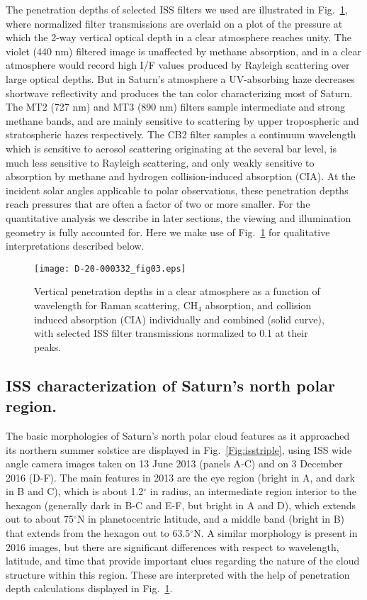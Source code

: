 \documentclass[article,11pt]{emulateapj}
\def\deg{$^\circ$ }
\def\degx{$^\circ$}
\def\chf{CH$_4$ }
\begin{document}
The penetration depths of selected ISS filters we used are illustrated
in Fig.\ \ref{Fig:ccdpendepth}, where normalized filter transmissions
are overlaid on a plot of the pressure at which the 2-way vertical optical depth
in a clear atmosphere reaches unity.  The violet (440 nm) filtered image is
unaffected by methane absorption, and in a clear atmosphere would record
high I/F values produced by Rayleigh scattering over large optical
depths. But in Saturn's atmosphere a UV-absorbing haze decreases
shortwave reflectivity and produces the tan color characterizing most
of Saturn. The MT2 (727 nm) and MT3 (890 nm) filters sample
intermediate and strong methane bands, and are mainly sensitive to
scattering by upper tropospheric and stratospheric hazes respectively.  The CB2
filter samples a continuum wavelength which is sensitive to aerosol scattering
originating at the several bar level, is much less sensitive to
Rayleigh scattering, and only weakly sensitive to absorption by methane
and hydrogen collision-induced absorption (CIA).  At the incident
solar angles applicable to polar observations, these penetration
depths reach pressures that are often a factor of two or more smaller.
For the quantitative analysis we describe in later sections, the
viewing and illumination geometry is fully accounted for.  Here we
make use of Fig.\ \ref{Fig:ccdpendepth} for qualitative
interpretations described below.

\begin{figure}[!ht]\centering
\texttt{[image: D-20-000332\_fig03.eps]}
\caption{Vertical penetration depths in a clear atmosphere as a function
of wavelength for Raman scattering, \chf absorption, and collision
induced absorption (CIA) individually and combined (solid curve),
 with selected ISS filter transmissions normalized to 0.1 at
their peaks.}
\label{Fig:ccdpendepth}
\end{figure}


\subsection{ISS characterization of Saturn's north polar region. }

The basic morphologies of Saturn's north polar cloud features as it
approached its northern summer solstice are displayed in Fig.\ \ref{Fig:isstriple}, 
using ISS wide angle camera images taken on 13 June 2013 (panels A-C) and
on 3 December 2016 (D-F).  The main features in 2013 are the eye region (bright in A, and
dark in B and C), which is about 1.2\deg in
radius, an intermediate region interior to the hexagon (generally dark
in B-C and E-F, but bright in A and D), which extends
out to about 75\degx N in planetocentric latitude, and a middle band (bright in B) that extends from
the hexagon out to 63.5\degx N.  A similar morphology is present in 2016 images, but
there are significant differences with respect to wavelength, latitude, and time
that provide important clues regarding the nature of the cloud
structure within this region.  These are interpreted with
the help of penetration depth calculations displayed in
Fig.\ \ref{Fig:ccdpendepth}.   
\end{document}
